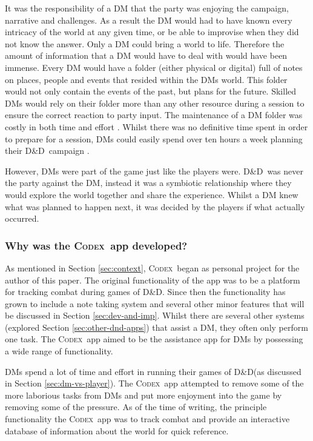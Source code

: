 \documentclass[final]{cmpreport}
\newcommand{\dnd}{D\&D}
\newcommand{\Codex}{\textsc{Codex}}
\begin{document}
			It was the responsibility of a DM that the party was enjoying the campaign, narrative and challenges. As a result the DM would had to have known every intricacy of the world at any given time, or be able to improvise when they did not know the answer. Only a DM could bring a world to life. Therefore the amount of information that a DM would have to deal with would have been immense. Every DM would have a folder (either physical or digital) full of notes on places, people and events that resided within the DMs world. This folder would not only contain the events of the past, but plans for the future. Skilled DMs would rely on their folder more than any other resource during a session to ensure the correct reaction to party input. The maintenance of a DM folder was costly in both time and effort \citep{GMTips}. Whilst there was no definitive time spent in order to prepare for a session, DMs could easily spend over ten hours a week planning their \dnd \ campaign \citep{DungeonMaster}. 
			
			However, DMs were part of the game just like the players were. \dnd \ was never the party against the DM, instead it was a symbiotic relationship where they would explore the world together and share the experience. Whilst a DM knew what was planned to happen next, it was decided by the players if what actually occurred. 
				
			\subsubsection{Why was the \Codex \ app developed?} \label{sec:why-codex}
			As mentioned in Section \ref{sec:context}, \Codex \ began as personal project for the author of this paper. The original functionality of the app was to be a platform for tracking combat during games of \dnd. Since then the functionality has grown to include a note taking system and several other minor features that will be discussed in Section \ref{sec:dev-and-imp}. Whilst there are several other systems (explored Section \ref{sec:other-dnd-apps}) that assist a DM, they often only perform one task. The \Codex \ app aimed to be the assistance app for DMs by possessing a wide range of functionality. 
			
			DMs spend a lot of time and effort in running their games of \dnd (as discussed in Section \ref{sec:dm-vs-player}). The \Codex \ app attempted to remove some of the more laborious tasks from DMs and put more enjoyment into the game by removing some of the pressure. As of the time of writing, the principle functionality the \Codex \ app was to track combat and provide an interactive database of information about the world for quick reference.
\end{document}
